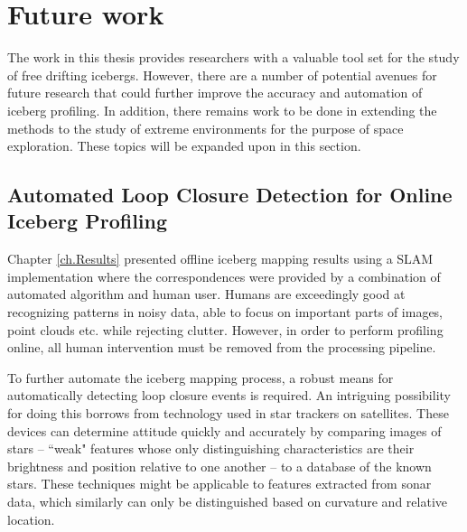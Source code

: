 \section{Future work}

The work in this thesis provides researchers with a valuable tool set for the study of free drifting icebergs. However, there  are a number of potential avenues for future research that could further improve the accuracy and automation of iceberg profiling. In addition, there remains work to be done in extending the methods to the study of extreme environments for the purpose of space exploration. 
These topics will be expanded upon in this section. 


\subsection{Automated Loop Closure Detection for Online Iceberg Profiling}
Chapter \ref{ch.Results} presented offline iceberg mapping results using a SLAM implementation where the correspondences were provided by a combination of automated algorithm and human user. Humans are exceedingly good at recognizing patterns in noisy data, able to focus on important parts of images, point clouds etc. while rejecting clutter. However, in order to perform profiling online, all human intervention must be removed from the processing pipeline. 

To further automate the iceberg mapping process, a robust means for automatically detecting loop closure events is required. An intriguing possibility for doing this borrows from technology used in star trackers on satellites. These devices can determine attitude quickly and accurately by comparing images of stars -- ``weak" features whose only distinguishing characteristics are their brightness and position relative to one another -- to a database of the known stars. These techniques might be applicable to features extracted from sonar data, which similarly can only be distinguished based on curvature and relative location. 

